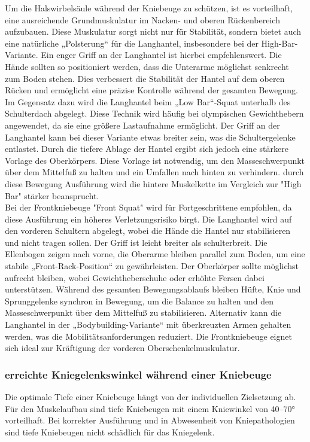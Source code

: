 \noindent Um die Halswirbelsäule während der Kniebeuge zu schützen, ist es vorteilhaft, eine ausreichende Grundmuskulatur im Nacken- und oberen Rückenbereich aufzubauen. Diese Muskulatur sorgt nicht nur für Stabilität, sondern bietet auch eine natürliche „Polsterung“ für die Langhantel, insbesondere bei der High-Bar-Variante. Ein enger Griff an der Langhantel ist hierbei empfehlenswert. Die Hände sollten so positioniert werden, dass die Unterarme möglichst senkrecht zum Boden stehen. Dies verbessert die Stabilität der Hantel auf dem oberen Rücken und ermöglicht eine präzise Kontrolle während der gesamten Bewegung. \cite{Meinart}
\\
\noindent Im Gegensatz dazu wird die Langhantel beim „Low Bar“-Squat unterhalb des Schulterdach abgelegt. Diese Technik wird häufig bei olympischen Gewichthebern angewendet, da sie eine größere Lastaufnahme ermöglicht. \cite{Meinart}
\noindent Der Griff an der Langhantel kann bei dieser Variante etwas breiter sein, was die Schultergelenke entlastet. Durch die tiefere Ablage der Hantel ergibt sich jedoch eine stärkere Vorlage des Oberkörpers. Diese Vorlage ist notwendig, um den Masseschwerpunkt über dem Mittelfuß zu halten und ein Umfallen nach hinten zu verhindern. durch diese Bewegung Ausführung wird die hintere Muskelkette im Vergleich zur "High Bar" stärker beansprucht. \cite{Meinart}
\\
\noindent Bei der Frontkniebeuge "Front Squat" wird für Fortgeschrittene empfohlen, da diese Ausführung ein höheres Verletzungsrisiko birgt. Die Langhantel wird auf den vorderen Schultern abgelegt, wobei die Hände die Hantel nur stabilisieren und nicht tragen sollen. Der Griff ist leicht breiter als schulterbreit. Die Ellenbogen zeigen nach vorne, die Oberarme bleiben parallel zum Boden, um eine stabile „Front-Rack-Position“ zu gewährleisten. Der Oberkörper sollte möglichst aufrecht bleiben, wobei Gewichtheberschuhe oder erhöhte Fersen dabei unterstützen. Während des gesamten Bewegungsablaufs bleiben Hüfte, Knie und Sprunggelenke synchron in Bewegung, um die Balance zu halten und den Masseschwerpunkt über dem Mittelfuß zu stabilisieren. Alternativ kann die Langhantel in der „Bodybuilding-Variante“ mit überkreuzten Armen gehalten werden, was die Mobilitätsanforderungen reduziert. Die Frontkniebeuge eignet sich ideal zur Kräftigung der vorderen Oberschenkelmuskulatur. \cite{Meinart}

\subsubsection{erreichte Kniegelenkswinkel während einer Kniebeuge}
\noindent Die optimale Tiefe einer Kniebeuge hängt von der individuellen Zielsetzung ab. 
\noindent Für den Muskelaufbau sind tiefe Kniebeugen mit einem Kniewinkel von 40–70° vorteilhaft.\cite{Hartmann2014} Bei korrekter Ausführung und in Abwesenheit von Kniepathologien sind tiefe Kniebeugen nicht schädlich für das Kniegelenk.\cite{Hartmann2014} 

